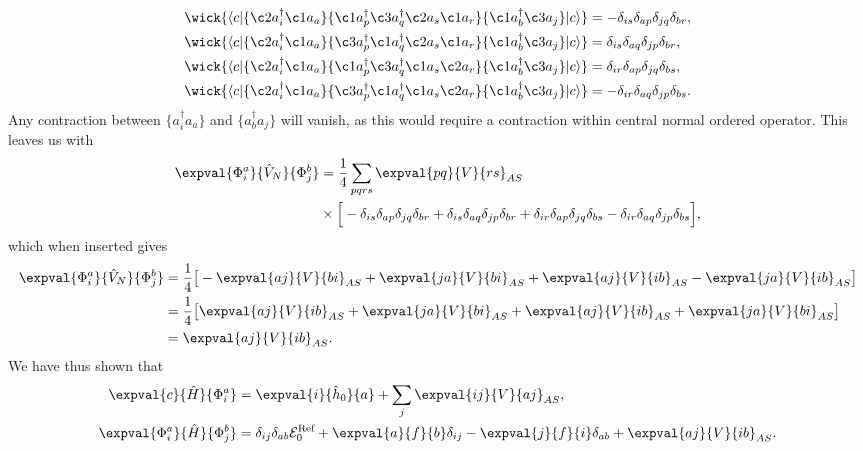 \begin{align*}
    \wick{
        \langle c \vert
        \{ \c2 a_i^\dagger \c1 a_a \}
        \{ \c1 a_p^\dagger \c3 a_q^\dagger \c2 a_s \c1 a_r \}
        \{ \c1 a_b^\dagger \c3 a_j \}
        \vert c \rangle
    }
    &= -\delta_{is} \delta_{ap} \delta_{jq} \delta_{br}, \\
    \wick{
        \langle c \vert
        \{ \c2 a_i^\dagger \c1 a_a \}
        \{ \c3 a_p^\dagger \c1 a_q^\dagger \c2 a_s \c1 a_r \}
        \{ \c1 a_b^\dagger \c3 a_j \}
        \vert c \rangle
    } &= \delta_{is} \delta_{aq} \delta_{jp} \delta_{br}, \\
    \wick{
        \langle c \vert
        \{ \c2 a_i^\dagger \c1 a_a \}
        \{ \c1 a_p^\dagger \c3 a_q^\dagger \c1 a_s \c2 a_r \}
        \{ \c1 a_b^\dagger \c3 a_j \}
        \vert c \rangle
    } &= \delta_{ir} \delta_{ap} \delta_{jq} \delta_{bs}, \\
    \wick{
        \langle c \vert
        \{ \c2 a_i^\dagger \c1 a_a \}
        \{ \c3 a_p^\dagger \c1 a_q^\dagger \c1 a_s \c2 a_r \}
        \{ \c1 a_b^\dagger \c3 a_j \}
        \vert c \rangle
    } &= -\delta_{ir} \delta_{aq} \delta_{jp} \delta_{bs}.
\end{align*}
Any contraction between $\{a_i^\dagger a_a\}$ and $\{a_b^\dagger a_j\}$ will vanish, as this would require a contraction within central normal ordered operator.
This leaves us with
\begin{align*}
    \expval{\Phi_i^a}{\hat{V}_N}{\Phi_{j}^{b}}
    &= \frac{1}{4} \sum_{pqrs} \expval{pq}{V}{rs}_{AS} \\
    &\times \Big[
        - \delta_{is} \delta_{ap} \delta_{jq} \delta_{br}
        + \delta_{is} \delta_{aq} \delta_{jp} \delta_{br}
        + \delta_{ir} \delta_{ap} \delta_{jq} \delta_{bs}
        - \delta_{ir} \delta_{aq} \delta_{jp} \delta_{bs}
    \Big],
\end{align*}
which when inserted gives
\begin{align*}
    \expval{\Phi_i^a}{\hat{V}_N}{\Phi_{j}^{b}} &= \frac{1}{4} \big[
        -\expval{aj}{V}{bi}_{AS} + \expval{ja}{V}{bi}_{AS} + \expval{aj}{V}{ib}_{AS} - \expval{ja}{V}{ib}_{AS}
    \big] \\
    &= \frac{1}{4} \big[
        \expval{aj}{V}{ib}_{AS} + \expval{ja}{V}{bi}_{AS} + \expval{aj}{V}{ib}_{AS} + \expval{ja}{V}{bi}_{AS}
    \big] \\
    &= \expval{aj}{V}{ib}_{AS}.
\end{align*}
We have thus shown that
\begin{equation}
    \begin{split}
        \expval{c}{\hat{H}}{\Phi_i^a} &= \expval{i}{\hat{h}_0}{a} + \sum_{j} \expval{ij}{V}{aj}_{AS}, \\
        \expval{\Phi_i^a}{\hat{H}}{\Phi_{j}^{b}} &= \delta_{ij} \delta_{ab} \mathcal{E}_0^{\text{Ref}} + \expval{a}{f}{b} \delta_{ij} - \expval{j}{f}{i} \delta_{ab} + \expval{aj}{V}{ib}_{AS}.
    \end{split}
\end{equation}

